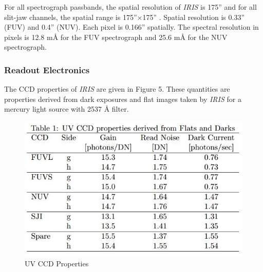 \documentclass[10pt,a4paper,titlepage]{article}
\begin{document}
			For all spectrograph passbands, the spatial resolution of \textit{IRIS} is 175'' and for all slit-jaw channels, the spatial range is 175''$\times$175'' \cite{ITN1}. Spatial resolution is 0.33'' (FUV) and 0.4'' (NUV). Each pixel is 0.166'' spatially. The spectral resolution in pixels is 12.8 m{\AA} for the FUV spectrograph and 25.6 m{\AA} for the NUV spectrograph.
			
			\subsubsection{Readout Electronics}
			The CCD properties of \textit{IRIS} are given in Figure 5. These quantities are properties derived from dark exposures and flat images taken by \textit{IRIS} for a mercury light source with 2537 {\AA} filter.\\
			
				\begin{figure}[H]
					\includegraphics[scale=0.6]{gaintable}
					\centering
					\caption{UV CCD Properties \cite{ITN25}}
					\centering
				\end{figure}
			
\end{document}
